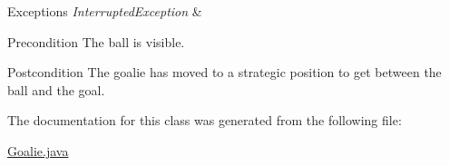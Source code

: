 \begin{DoxyExceptions}{Exceptions}
{\em InterruptedException} & \\
\hline
\end{DoxyExceptions}
\begin{DoxyPrecond}{Precondition}
The ball is visible. 
\end{DoxyPrecond}
\begin{DoxyPostcond}{Postcondition}
The goalie has moved to a strategic position to get between the ball and the goal. 
\end{DoxyPostcond}


The documentation for this class was generated from the following file:\begin{DoxyCompactItemize}
\item 
\hyperlink{Goalie_8java}{Goalie.java}\end{DoxyCompactItemize}
